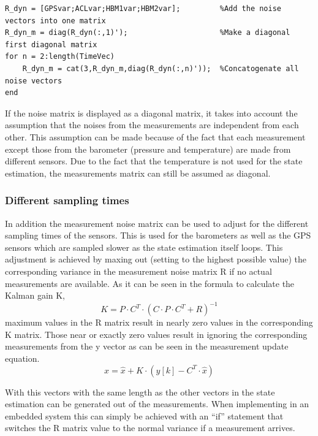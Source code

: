 \begin{lstlisting}[caption={Mesurements noise matrix conagonating}]
R_dyn = [GPSvar;ACLvar;HBM1var;HBM2var];         %Add the noise vectors into one matrix
R_dyn_m = diag(R_dyn(:,1)');                     %Make a diagonal first diagonal matrix
for n = 2:length(TimeVec)
    R_dyn_m = cat(3,R_dyn_m,diag(R_dyn(:,n)'));  %Concatogenate all noise vectors
end
\end{lstlisting}


If the noise matrix is displayed as a diagonal matrix,
it takes into account the assumption that the noises from the measurements are independent from each other.
This assumption can be made because of the fact that each measurement except those from the barometer (pressure and temperature) are made from different sensors.
Due to the fact that the temperature is not used for the state estimation, the measurements matrix can still be assumed as diagonal.

\subsubsection{Different sampling times}
In addition the measurement noise matrix can be used to adjust for the different sampling times of the sensors.
This is used for the barometers as well as the GPS sensors which are sampled slower as the state estimation itself loops.
This adjustment is achieved by maxing out (setting to the highest possible value) the corresponding variance in the measurement noise matrix R if no actual measurements are available.
As it can be seen in the formula to calculate the Kalman gain K,
$$  K = P\cdot C^T\cdot (C\cdot P\cdot C^T + R)^{-1} $$
maximum values in the R matrix result in nearly zero values in the corresponding K matrix.
Those near or exactly zero values result in ignoring the corresponding measurements from the y vector as can be seen in the measurement update equation.
$$  x = \hat{x} + K\cdot(y[k] - C^T \cdot \hat{x}) $$

With this vectors with the same length as the other vectors in the state estimation can be generated out of the measurements.
When implementing in an embedded system this can simply be achieved with an ``if'' statement that switches the R matrix value to the normal variance if a measurement arrives.

